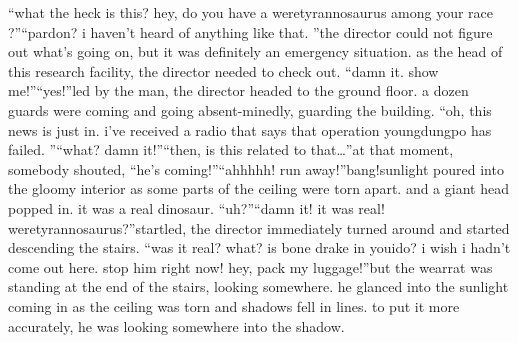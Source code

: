 “what the heck is this? hey, do you have a weretyrannosaurus among your race ?”“pardon? i haven’t heard of anything like that.
”the director could not figure out what’s going on, but it was definitely an emergency situation.
as the head of this research facility, the director needed to check out.
“damn it.
 show me!”“yes!”led by the man, the director headed to the ground floor.
 a dozen guards were coming and going absent-minedly, guarding the building.
“oh, this news is just in.
 i’ve received a radio that says that operation youngdungpo has failed.
”“what? damn it!”“then, is this related to that…”at that moment, somebody shouted, “he’s coming!”“ahhhhh! run away!”bang!sunlight poured into the gloomy interior as some parts of the ceiling were torn apart.
and a giant head popped in.
it was a real dinosaur.
“uh?”“damn it! it was real! weretyrannosaurus?”startled, the director immediately turned around and started descending the stairs.
“was it real? what? is bone drake in youido? i wish i hadn’t come out here.
 stop him right now! hey, pack my luggage!”but the wearrat was standing at the end of the stairs, looking somewhere.
he glanced into the sunlight coming in as the ceiling was torn and shadows fell in lines.
 to put it more accurately, he was looking somewhere into the shadow.

